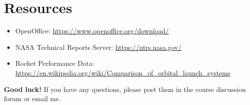 \documentclass[a4paper,12pt]{article}
\begin{document}
\section{Resources}
\begin{itemize}
    \item OpenOffice: \url{https://www.openoffice.org/download/}
    \item NASA Technical Reports Server: \url{https://ntrs.nasa.gov/}
    \item Rocket Performance Data: \url{https://en.wikipedia.org/wiki/Comparison_of_orbital_launch_systems}
\end{itemize}

\textbf{Good luck!} If you have any questions, please post them in the course discussion forum or email me.
\end{document}
